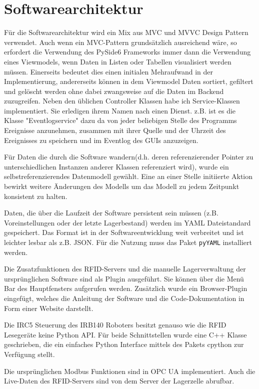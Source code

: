 ﻿\chapter{Softwarearchitektur}\label{Software}

Für die Softwarearchitektur wird ein Mix aus MVC und MVVC Design Pattern verwendet. 
Auch wenn ein MVC-Pattern grundsätzlich ausreichend wäre, so erfordert die Verwendung des PySide6 Frameworks immer 
dann die Verwendung eines Viewmodels, wenn Daten in Listen oder Tabellen visualisiert werden müssen. 
Einerseits bedeutet dies einen initialen Mehraufwand in der Implementierung, andererseits können in dem Viewmodel 
Daten sortiert, gefiltert und gelöscht werden ohne dabei zwangsweise auf die Daten im Backend zuzugreifen. 
Neben den üblichen Controller Klassen habe ich Service-Klassen implementiert. Sie erledigen ihrem Namen nach einen Dienst. 
z.B. ist es die Klasse "Eventlogservice" dazu da von jeder beliebigen Stelle des Programms Ereignisse anzunehmen, zusammen mit ihrer 
Quelle und der Uhrzeit des Ereignisses zu speichern und im Eventlog des GUIs anzuzeigen. 

Für Daten die durch die Software \glqq wandern\grqq (d.h. deren referenzierender Pointer zu unterschiedlichen Instanzen anderer Klassen referenziert wird), 
wurde ein selbstreferenzierendes Datenmodell gewählt. Eine an einer Stelle initiierte Aktion bewirkt weitere Änderungen des Modells um
das Modell zu jedem Zeitpunkt konsistent zu halten.

Daten, die über die Laufzeit der Software persistent sein müssen (z.B. Voreinstellungen oder der letzte Lagerbestand) werden im YAML
Dateistandard gespeichert. Das Format ist in der Softwareentwicklung weit verbreitet und ist leichter lesbar als z.B. JSON. 
Für die Nutzung muss das Paket \verb|pyYAML| installiert werden.

Die Zusatzfunktionen des RFID-Servers und die manuelle Lagerverwaltung der ursprünglichen Software sind als Plugin ausgeführt. 
Sie können über die Menü Bar des Hauptfensters aufgerufen werden. Zusätzlich wurde ein Browser-Plugin eingefügt, welches die
Anleitung der Software und die Code-Dokumentation in Form einer Website darstellt. 

Die IRC5 Steuerung des IRB140 Roboters besitzt genauso wie die RFID Lesegeräte keine Python API. Für beide Schnittstellen wurde eine
C++ Klasse geschrieben, die ein einfaches Python Interface mittels des Pakets cpython zur Verfügung stellt. 

Die ursprünglichen Modbus Funktionen sind in OPC UA implementiert. 
Auch die Live-Daten des RFID-Servers sind von dem Server der Lagerzelle abrufbar. 

